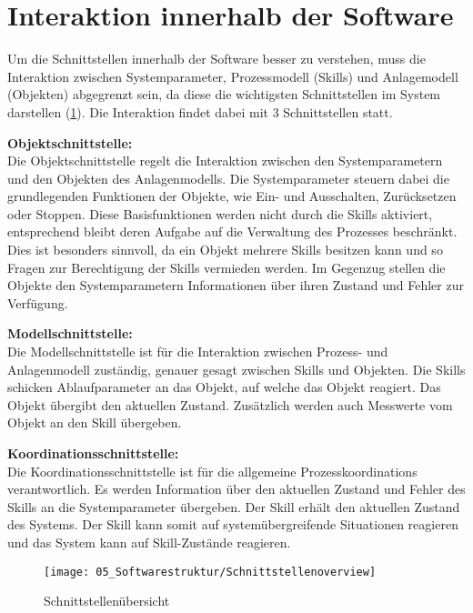 \section{Interaktion innerhalb der Software} \label{Softwareinteraktion}

	Um die Schnittstellen innerhalb der Software besser zu verstehen, muss die Interaktion zwischen Systemparameter, Prozessmodell (Skills) und Anlagemodell (Objekten) abgegrenzt sein, da diese die wichtigsten Schnittstellen im System darstellen (\ref{fig:Schnittstellenübersicht}). Die Interaktion findet dabei mit 3 Schnittstellen statt. 
	
	\textbf{Objektschnittstelle:}
	\vspace{2mm} 
	\\
	Die Objektschnittstelle regelt die Interaktion zwischen den Systemparametern und den Objekten des Anlagenmodells. Die Systemparameter steuern dabei die grundlegenden Funktionen der Objekte, wie Ein- und Ausschalten, Zurücksetzen oder Stoppen. Diese Basisfunktionen werden nicht durch die Skills aktiviert, entsprechend bleibt deren Aufgabe auf die Verwaltung des Prozesses beschränkt. Dies ist besonders sinnvoll, da ein Objekt mehrere Skills besitzen kann und so Fragen zur Berechtigung der Skills vermieden werden. Im Gegenzug stellen die Objekte den Systemparametern Informationen über ihren Zustand und Fehler zur Verfügung.
	
	\textbf{Modellschnittstelle:}
	\vspace{2mm} 
	\\
	Die Modellschnittstelle ist für die Interaktion zwischen Prozess- und Anlagenmodell zuständig, genauer gesagt zwischen Skills und Objekten. Die Skills schicken Ablaufparameter an das Objekt, auf welche das Objekt reagiert. Das Objekt übergibt den aktuellen Zustand. Zusätzlich werden auch Messwerte vom Objekt an den Skill übergeben. 
	
	\textbf{Koordinationsschnittstelle:}
	\vspace{2mm} 
	\\
	Die Koordinationsschnittstelle ist für die allgemeine Prozesskoordinations verantwortlich. Es werden Information über den aktuellen Zustand und Fehler des Skills an die Systemparameter übergeben. Der Skill erhält den aktuellen Zustand des Systems. Der Skill kann somit auf systemübergreifende Situationen reagieren und das System kann auf Skill-Zustände reagieren.  
	
	\begin{figure}[h!]
		\centering
		\texttt{[image: 05\_Softwarestruktur/Schnittstellenoverview]}
		\captionsetup{justification=centering}
		\caption{Schnittstellenübersicht}
		\label{fig:Schnittstellenübersicht}
	\end{figure}
	
